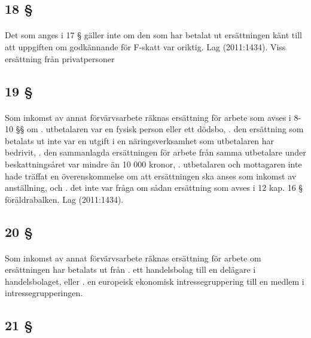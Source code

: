 \documentclass[a4paper,notitlepage,openany,10pt]{book}
\begin{document}
\subsection*{18 §}
\paragraph*{}
Det som anges i 17 § gäller inte om den som har betalat ut ersättningen känt till att uppgiften om godkännande för F-skatt var oriktig.
Lag (2011:1434).
Viss ersättning från privatpersoner
\subsection*{19 §}
\paragraph*{}
Som inkomst av annat förvärvsarbete räknas ersättning för arbete som avses i 8-10 §§ om
. utbetalaren var en fysisk person eller ett dödsbo,
. den ersättning som betalats ut inte var en utgift i en näringsverksamhet som utbetalaren har bedrivit,
. den sammanlagda ersättningen för arbete från samma utbetalare under beskattningsåret var mindre än 10 000 kronor,
. utbetalaren och mottagaren inte hade träffat en överenskommelse om att ersättningen ska anses som inkomst av anställning, och
. det inte var fråga om sådan ersättning som avses i 12 kap. 16 § föräldrabalken.
Lag (2011:1434).
\subsection*{20 §}
\paragraph*{}
Som inkomst av annat förvärvsarbete räknas ersättning för arbete om ersättningen har betalats ut från
. ett handelsbolag till en delägare i handelsbolaget, eller
. en europeisk ekonomisk intressegruppering till en medlem i intressegrupperingen.
\subsection*{21 §}
\end{document}
